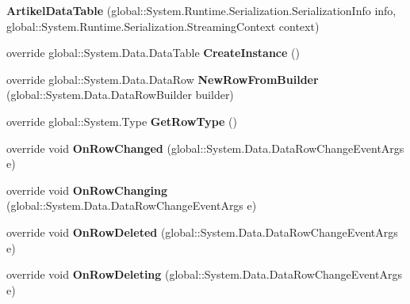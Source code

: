 \begin{DoxyCompactItemize}
\item 
{\bfseries Artikel\+Data\+Table} (global\+::\+System.\+Runtime.\+Serialization.\+Serialization\+Info info, global\+::\+System.\+Runtime.\+Serialization.\+Streaming\+Context context)\hypertarget{class_products_1_1_data_1_1ds_sage_1_1_artikel_data_table_a03ae46b5d4469c8044190051552d2d28}{}\label{class_products_1_1_data_1_1ds_sage_1_1_artikel_data_table_a03ae46b5d4469c8044190051552d2d28}

\item 
override global\+::\+System.\+Data.\+Data\+Table {\bfseries Create\+Instance} ()\hypertarget{class_products_1_1_data_1_1ds_sage_1_1_artikel_data_table_a5250a4605c0e9969f536860d52e5e820}{}\label{class_products_1_1_data_1_1ds_sage_1_1_artikel_data_table_a5250a4605c0e9969f536860d52e5e820}

\item 
override global\+::\+System.\+Data.\+Data\+Row {\bfseries New\+Row\+From\+Builder} (global\+::\+System.\+Data.\+Data\+Row\+Builder builder)\hypertarget{class_products_1_1_data_1_1ds_sage_1_1_artikel_data_table_af7589cf7be007449ffffc2e26c49bd4b}{}\label{class_products_1_1_data_1_1ds_sage_1_1_artikel_data_table_af7589cf7be007449ffffc2e26c49bd4b}

\item 
override global\+::\+System.\+Type {\bfseries Get\+Row\+Type} ()\hypertarget{class_products_1_1_data_1_1ds_sage_1_1_artikel_data_table_a671b0711b320acaa83ddfd9a6bf92b91}{}\label{class_products_1_1_data_1_1ds_sage_1_1_artikel_data_table_a671b0711b320acaa83ddfd9a6bf92b91}

\item 
override void {\bfseries On\+Row\+Changed} (global\+::\+System.\+Data.\+Data\+Row\+Change\+Event\+Args e)\hypertarget{class_products_1_1_data_1_1ds_sage_1_1_artikel_data_table_a5153dc322f0fb0f527e33b64763e7bac}{}\label{class_products_1_1_data_1_1ds_sage_1_1_artikel_data_table_a5153dc322f0fb0f527e33b64763e7bac}

\item 
override void {\bfseries On\+Row\+Changing} (global\+::\+System.\+Data.\+Data\+Row\+Change\+Event\+Args e)\hypertarget{class_products_1_1_data_1_1ds_sage_1_1_artikel_data_table_abd725f2b2689f1053f7bac302d0a0105}{}\label{class_products_1_1_data_1_1ds_sage_1_1_artikel_data_table_abd725f2b2689f1053f7bac302d0a0105}

\item 
override void {\bfseries On\+Row\+Deleted} (global\+::\+System.\+Data.\+Data\+Row\+Change\+Event\+Args e)\hypertarget{class_products_1_1_data_1_1ds_sage_1_1_artikel_data_table_a4a3973bc2aa9e04d4e9c8cb4a6c14469}{}\label{class_products_1_1_data_1_1ds_sage_1_1_artikel_data_table_a4a3973bc2aa9e04d4e9c8cb4a6c14469}

\item 
override void {\bfseries On\+Row\+Deleting} (global\+::\+System.\+Data.\+Data\+Row\+Change\+Event\+Args e)\hypertarget{class_products_1_1_data_1_1ds_sage_1_1_artikel_data_table_a134d6bc2f133e59b6463d6868dfbe6aa}{}\label{class_products_1_1_data_1_1ds_sage_1_1_artikel_data_table_a134d6bc2f133e59b6463d6868dfbe6aa}

\end{DoxyCompactItemize}
